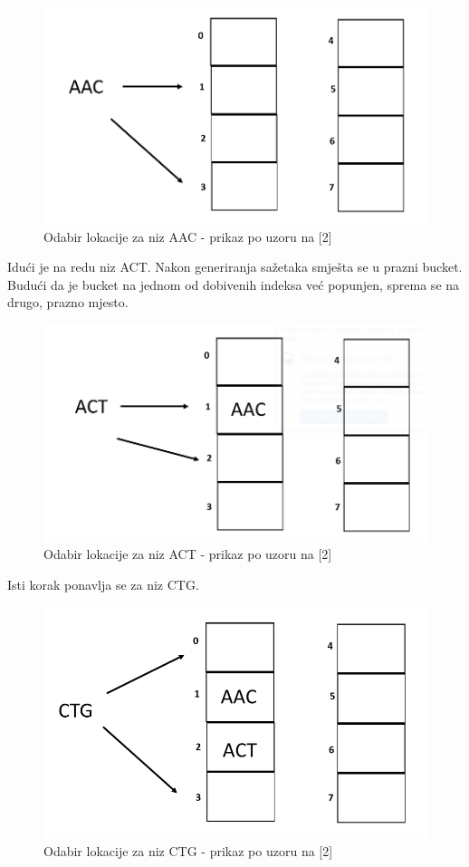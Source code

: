\documentclass[times, utf8, seminar, numeric]{fer}
\begin{document}
\begin{figure}[H]
  \centering
  \setlength{\intextsep}{5pt}
  \includegraphics[scale = 0.4]{images/insertion1.png}
  \caption{Odabir lokacije za niz AAC - prikaz po uzoru na [2]}
  \label{fig_insert1}
\end{figure}
Idući je na redu niz ACT. Nakon generiranja sažetaka smješta se u prazni bucket. Budući da je bucket na jednom od dobivenih indeksa već popunjen, sprema se na drugo, prazno mjesto.
\begin{figure}[H]
  \centering
  \setlength{\intextsep}{5pt}
  \includegraphics[scale = 0.4]{images/insertion2.png}
  \caption{Odabir lokacije za niz ACT - prikaz po uzoru na [2]}
  \label{fig_insert2}
\end{figure}

Isti korak ponavlja se za niz CTG.
\begin{figure}[H]
  \centering
  \setlength{\intextsep}{5pt}
  \includegraphics[scale = 0.4]{images/insertion3.png}
  \caption{Odabir lokacije za niz CTG - prikaz po uzoru na [2]}
  \label{fig_insert3}
\end{figure}
\end{document}

